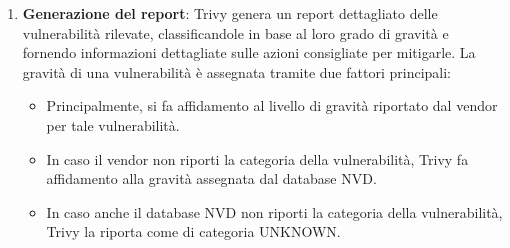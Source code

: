 \begin{enumerate}
   \item \textbf{Generazione del report}: Trivy genera un report dettagliato delle vulnerabilità rilevate, classificandole in base al loro grado di gravità e fornendo informazioni dettagliate sulle azioni consigliate per mitigarle. La gravità di una vulnerabilità è assegnata tramite due fattori principali:
         \begin{itemize}
            \item Principalmente, si fa affidamento al livello di gravità riportato dal vendor per tale vulnerabilità.
            \item In caso il vendor non riporti la categoria della vulnerabilità, Trivy fa affidamento alla gravità assegnata dal database NVD.
            \item In caso anche il database NVD non riporti la categoria della vulnerabilità, Trivy la riporta come di categoria UNKNOWN.
         \end{itemize}
\end{enumerate}
